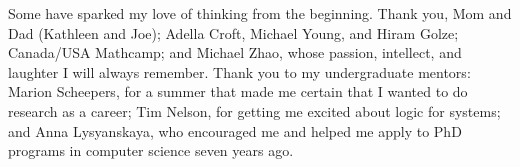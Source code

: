 Some have sparked my love of thinking from the beginning.
Thank you, Mom and Dad (Kathleen and Joe);
Adella Croft, Michael Young, and Hiram Golze;
Canada/USA Mathcamp;
and Michael Zhao,
whose passion, intellect, and laughter I will always remember.
Thank you to my undergraduate mentors: Marion Scheepers, for a summer that made me certain that I wanted to do research as a career;
Tim Nelson, for getting me excited about logic for systems;
and Anna Lysyanskaya, who encouraged me and helped me apply to PhD programs in computer science seven years ago.
